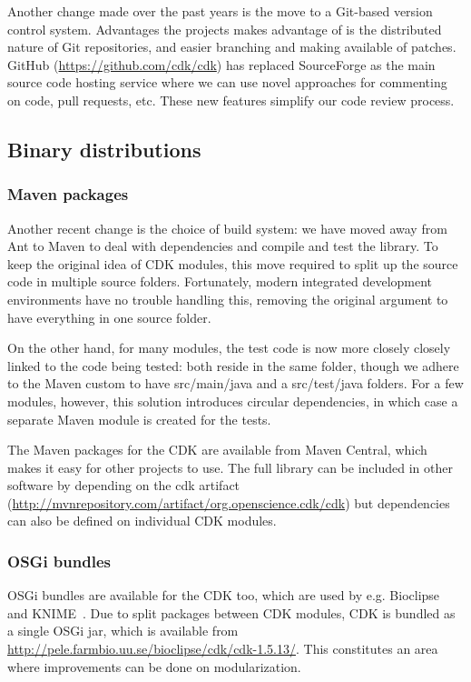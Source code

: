 \documentclass[10pt]{bmcart}
\begin{document}
Another change made over the past years is the move to a Git-based version
control system. Advantages the projects makes advantage of is the distributed
nature of Git repositories, and easier branching and making available of
patches. GitHub (\url{https://github.com/cdk/cdk}) has replaced SourceForge
as the main source code hosting service
where we can use novel approaches for commenting on code, pull requests, etc.
These new features simplify our code review process.

\subsection*{Binary distributions}

\subsubsection*{Maven packages}

Another recent change is the choice of build system: we have moved away from
Ant to Maven to deal with dependencies and compile and test the library.
To keep the original idea of CDK modules, this move required to split up the
source code in multiple source folders. Fortunately, modern integrated
development environments have no trouble handling this, removing the original
argument to have everything in one source folder.

On the other hand, for many modules, the test code is now more closely closely
linked to the code being tested: both reside in the same folder, though we
adhere to the Maven custom to have src/main/java and a src/test/java folders.
For a few modules, however, this solution introduces circular dependencies, in
which case a separate Maven module is created for the tests.

The Maven packages for the CDK are available from Maven Central, which makes it
easy for other projects to use. The full library can be included in other
software by depending on the cdk artifact (\url{http://mvnrepository.com/artifact/org.openscience.cdk/cdk})
but dependencies can also be defined on individual CDK modules.

\subsubsection*{OSGi bundles}

OSGi bundles are available for the CDK too, which are used by e.g. Bioclipse~\cite{spjuth2007bioclipse,spjuth2009bioclipse} and KNIME~\cite{Beisken2013}. Due to split packages between CDK modules, CDK is bundled as a single OSGi jar, which is available from \url{http://pele.farmbio.uu.se/bioclipse/cdk/cdk-1.5.13/}. This constitutes an area where improvements can be done on modularization.
\end{document}

